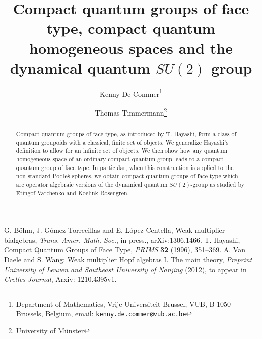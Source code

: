 \documentclass[11pt]{article}
\date{}
\theoremstyle{change}
\theoremstyle{definition}
\numberwithin{equation}{section}
\begin{document}
\title{Compact quantum groups of face type, compact quantum homogeneous spaces and the dynamical quantum $SU(2)$ group}

\author{Kenny De Commer\thanks{Department of Mathematics, Vrije Universiteit Brussel, VUB, B-1050 Brussels, Belgium, email: {\tt kenny.de.commer@vub.ac.be}}
\and Thomas Timmermann\thanks{University of M\"{u}nster}}

\maketitle

\begin{abstract}
\noindent Compact quantum groups of face type, as introduced by T. Hayashi, form a class of quantum groupoids with a classical, finite set of objects. We generalize Hayashi's definition to allow for an infinite set of objects. We then show how any quantum homogeneous space of an ordinary compact quantum group leads to a compact quantum group of face type. In particular, when this construction is applied to the non-standard Podle\'{s} spheres, we obtain compact quantum groups of face type which are operator algebraic versions of the dynamical quantum $SU(2)$-group as studied by Etingof-Varchenko and Koelink-Rosengren.%
\end{abstract}














\begin{thebibliography}{99}
  G. B\"{o}hm, J. Gómez-Torrecillas and E. López-Centella, Weak multiplier bialgebras, \emph{Trans. Amer. Math. Soc.}, in press., arXiv:1306.1466. 
 T. Hayashi, Compact Quantum Groups of Face Type, \emph{PRIMS} \textbf{32} (1996), 351--369.
 A. Van Daele and S. Wang: Weak multiplier Hopf algebras I. The main theory, \emph{Preprint University of Leuven and Southeast University of Nanjing} (2012), to appear in
\emph{Crelles Journal}, Arxiv: 1210.4395v1.
\end{thebibliography}
\end{document}
